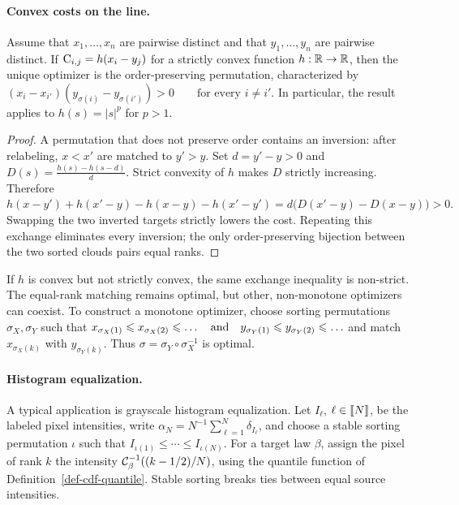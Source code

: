 \paragraph{Convex costs on the line.}
\begin{proposition}\label{prop-matching-1d-monotone}
Assume that $x_1,\ldots,x_n$ are pairwise distinct and that $y_1,\ldots,y_n$ are pairwise distinct. If $\mathrm{C}_{i,j}=h(x_i-y_j)$ for a strictly convex function $h:\mathbb{R}\to\mathbb{R}$, then the unique optimizer is the order-preserving permutation, characterized by
\((x_i-x_{i'})(y_{\sigma(i)}-y_{\sigma(i')})>0 \qquad\text{for every }i\neq i'.\)
In particular, the result applies to $h(s)=|s|^p$ for $p>1$.
\end{proposition}
\begin{proof}
A permutation that does not preserve order contains an inversion: after relabeling, $x<x'$ are matched to $y'>y$. Set $d=y'-y>0$ and
\(D(s)=\frac{h(s)-h(s-d)}{d}\).
Strict convexity of $h$ makes $D$ strictly increasing. Therefore
\(h(x-y')+h(x'-y)-h(x-y)-h(x'-y') =d\bigl(D(x'-y)-D(x-y)\bigr)>0.\)
Swapping the two inverted targets strictly lowers the cost. Repeating this exchange eliminates every inversion; the only order-preserving bijection between the two sorted clouds pairs equal ranks.
\end{proof}
If $h$ is convex but not strictly convex, the same exchange inequality is non-strict. The equal-rank matching remains optimal, but other, non-monotone optimizers can coexist. To construct a monotone optimizer, choose sorting permutations $\sigma_X,\sigma_Y$ such that
\(x_{\sigma_X(1)} \leqslant x_{\sigma_X(2)} \leqslant \ldots \quad \text{and} \quad y_{\sigma_Y(1)} \leqslant y_{\sigma_Y(2)} \leqslant \ldots\)
and match $x_{\sigma_X(k)}$ with $y_{\sigma_Y(k)}$. Thus $\sigma=\sigma_Y\circ\sigma_X^{-1}$ is optimal.

\paragraph{Histogram equalization.}
A typical application is grayscale histogram equalization. Let $I_\ell$, $\ell\in\llbracket N\rrbracket$, be the labeled pixel intensities, write $\alpha_N=N^{-1}\sum_{\ell=1}^N\delta_{I_\ell}$, and choose a stable sorting permutation $\iota$ such that $I_{\iota(1)}\leq\cdots\leq I_{\iota(N)}$. For a target law $\beta$, assign the pixel of rank $k$ the intensity $\mathcal{C}_{\beta}^{-1}((k-1/2)/N)$, using the quantile function of Definition~\ref{def-cdf-quantile}. Stable sorting breaks ties between equal source intensities.

